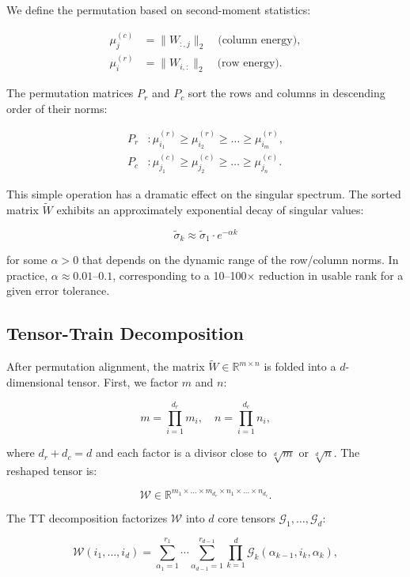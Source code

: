 \documentclass[11pt,a4paper]{article}
\begin{document}
We define the permutation based on second-moment statistics:

\begin{align*}
	\mu_j^{(c)} & = \|W_{:,j}\|_2 \quad \text{(column energy)}, \\
	\mu_i^{(r)} & = \|W_{i,:}\|_2 \quad \text{(row energy)}.
\end{align*}

The permutation matrices $P_r$ and $P_c$ sort the rows and columns in descending
order of their norms:

\begin{align*}
	P_r & : \mu_{i_1}^{(r)} \geq \mu_{i_2}^{(r)} \geq \dots \geq \mu_{i_m}^{(r)}, \\
	P_c & : \mu_{j_1}^{(c)} \geq \mu_{j_2}^{(c)} \geq \dots \geq \mu_{j_n}^{(c)}.
\end{align*}

This simple operation has a dramatic effect on the singular spectrum. The sorted
matrix $\tilde{W}$ exhibits an approximately exponential decay of singular values:

\[
	\tilde{\sigma}_k \approx \tilde{\sigma}_1 \cdot e^{-\alpha k}
\]

for some $\alpha > 0$ that depends on the dynamic range of the row/column norms.
In practice, $\alpha \approx 0.01$--$0.1$, corresponding to a 10--100$\times$
reduction in usable rank for a given error tolerance.

\subsection{Tensor-Train Decomposition}

After permutation alignment, the matrix $\tilde{W} \in \mathbb{R}^{m \times n}$
is folded into a $d$-dimensional tensor. First, we factor $m$ and $n$:

\[
	m = \prod_{i=1}^{d_r} m_i, \quad n = \prod_{i=1}^{d_c} n_i,
\]

where $d_r + d_c = d$ and each factor is a divisor close to $\sqrt[d]{m}$ or
$\sqrt[d]{n}$. The reshaped tensor is:

\[
	\mathcal{W} \in \mathbb{R}^{m_1 \times \dots \times m_{d_r} \times n_1 \times \dots \times n_{d_c}}.
\]

The TT decomposition factorizes $\mathcal{W}$ into $d$ core tensors
$\mathcal{G}_1, \dots, \mathcal{G}_d$:

\[
	\mathcal{W}(i_1, \dots, i_d) = \sum_{\alpha_1=1}^{r_1} \cdots \sum_{\alpha_{d-1}=1}^{r_{d-1}}
	\prod_{k=1}^d \mathcal{G}_k(\alpha_{k-1}, i_k, \alpha_k),
\]
\end{document}
